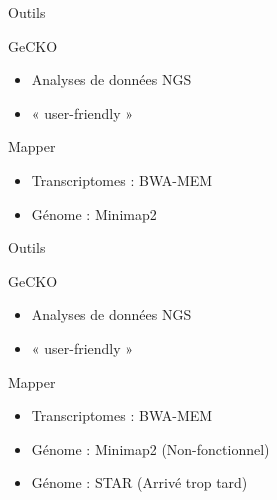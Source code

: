 \begin{frame}{Outils }
   
        \begin{block}{GeCKO \cite{ardisson_gecko_2024}}
            \begin{itemize}
                \item Analyses de données NGS
                \item « user-friendly »
            \end{itemize}
        \end{block}


    \begin{block}{Mapper}
        \begin{itemize}
            \item Transcriptomes : BWA-MEM
            \item Génome : Minimap2
        \end{itemize}
    \end{block}

\end{frame}

\begin{frame}{Outils}
   
    \begin{block}{GeCKO \cite{ardisson_gecko_2024}}
        \begin{itemize}
            \item Analyses de données NGS
            \item « user-friendly »
        \end{itemize}
    \end{block}


    \begin{block}{Mapper}
        \begin{itemize}
            \item Transcriptomes : BWA-MEM
            \item Génome : Minimap2 \pause (Non-fonctionnel)
            \item Génome : STAR (Arrivé trop tard)
        \end{itemize}
    \end{block}
\end{frame}
% 
